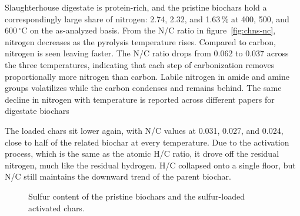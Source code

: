 Slaughterhouse digestate is protein-rich, and the pristine biochars hold a correspondingly large share of nitrogen: 2.74, 2.32, and 1.63\,\% at 400, 500, and 600\,$^{\circ}$C on the as-analyzed basis. From the N/C ratio in figure~\ref{fig:chns-nc}, nitrogen decreases as the pyrolysis temperature rises. Compared to carbon, nitrogen is seen leaving faster. The N/C ratio drops from 0.062 to 0.037 across the three temperatures, indicating that each step of carbonization removes proportionally more nitrogen than carbon.  Labile nitrogen in amide and amine groups volatilizes while the carbon condenses and remains behind. The same decline in nitrogen with temperature is reported across different papers for digestate biochars \cite{kujawska-2026, tomczyk-2020}
 
The loaded chars sit lower again, with N/C values at 0.031, 0.027, and 0.024, close to half of the related biochar at every temperature. Due to the activation process, which is the same as the atomic H/C ratio, it drove off the residual nitrogen, much like the residual hydrogen. H/C collapsed onto a single floor, but N/C still maintains the downward trend of the parent biochar.

\clearpage
\begin{figure}[ht]
\centering
{}
\caption{Sulfur content of the pristine biochars and the sulfur-loaded activated chars.}
\label{fig:chns-s}
\end{figure}

